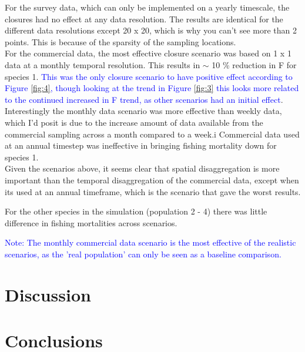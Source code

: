 \documentclass[review]{elsarticle}
\begin{document}
For the survey data, which can only be implemented on a yearly timescale, the
closures had no effect at any data resolution. The results are identical for
the different data resolutions except 20 x 20, which is why you can't see more
than 2 points. This is because of the sparsity of the sampling locations.\\

For the commercial data, the most effective closure scenario was based on 1 x 1
data at a monthly temporal resolution. This results in $\sim$ 10 \% reduction
in F for species 1. \textcolor{blue}{This was the only closure scenario to have
	positive effect according to Figure \ref{fig:4}, though looking at the
	trend in Figure \ref{fig:3} this looks more related to the continued
	increased in F trend, as other scenarios had an initial effect}.
Interestingly the monthly data scenario was more effective than weekly data,
which I'd posit is due to the increase amount of data available from the
commercial sampling across a month compared to a week.i Commercial data used at
an annual timestep was ineffective in bringing fishing mortality down for
species 1. \\

Given the scenarios above, it seems clear that spatial disaggregation is more
important than the temporal disaggregation of the commercial data, except when
its used at an annual timeframe, which is the scenario that gave the worst
results.

For the other species in the simulation (population 2 - 4) there was little
difference in fishing mortalities across scenarios.

\textcolor{blue}{Note: The monthly commercial data scenario is the most
	effective of the realistic scenarios, as the 'real population' can only
	be seen as a baseline comparison.}



\section{Discussion}

%
\section{Conclusions}
\end{document}
